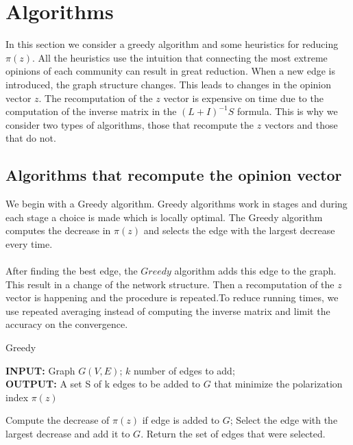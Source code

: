 \chapter{Algorithms}
\label{ch:algorithms}


In this section we  consider a greedy algorithm and some heuristics for reducing $\pi(z)$. All the heuristics use the intuition that connecting the most extreme opinions of each community can result in great reduction. 
When a new edge is introduced, the graph structure changes. This leads to changes in the opinion vector $z$.
The recomputation of the $z$ vector is expensive on time due to the computation of the inverse matrix in the $(L+I)^{-1}S$ formula.
This is why we consider two types of algorithms, those that recompute the $z$ vectors and those that do not.

\section{Algorithms that recompute the opinion vector}
\label{sec:recomputeAlgos}

We begin with a Greedy algorithm. Greedy algorithms work in stages and during each stage a choice is made which is locally optimal.
The Greedy algorithm computes the decrease in $\pi(z)$ and selects the edge with the largest decrease every time.
\\
\\
After finding the best edge, the $Greedy$ algorithm adds this edge to the graph. This result in a change of the network structure.
Then a recomputation of the $z$ vector is happening and  the procedure is repeated.To reduce running times, we  use repeated averaging instead of computing the inverse matrix and limit the accuracy on the convergence.

\vspace{30pt}
    		\begin{algorithm}[H]
		
			\caption{Greedy}
			\label{alg:greedyAlgo}
			
			\begin{flushleft}
        				\textbf{INPUT:} Graph $G(V, E)$; $k$ number of edges to add;
				\vspace{6pt} \\
        				\textbf{OUTPUT:} A set S of k edges to be added to $G$ that minimize the polarization \\
				 index $\pi(z)$
			\end{flushleft}
			
			\begin{algorithmic}[1]
						\STATE Compute the decrease of $\pi(z)$ if edge is added to $G$;
					\ENDFOR
					\STATE Select the edge with the largest decrease and add it to $G$.
				\ENDFOR
				\STATE Return the set of edges that were selected.
			\end{algorithmic}
		\end{algorithm}
\vspace{30pt}

